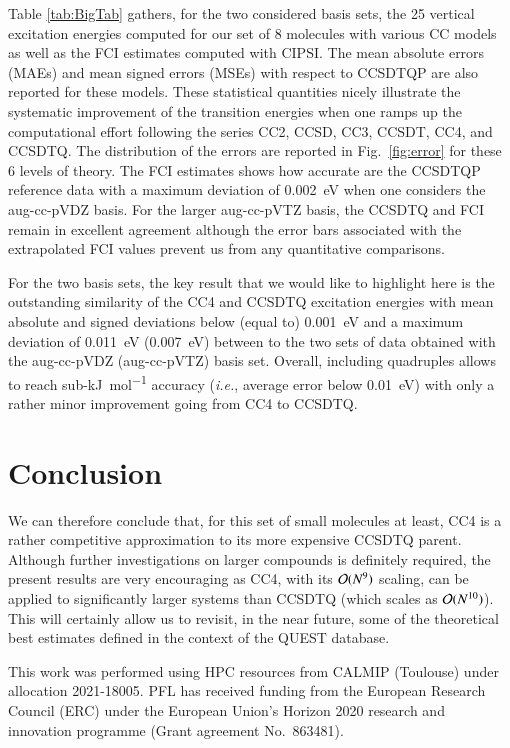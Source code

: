 \documentclass[aip,jcp,reprint,noshowkeys,superscriptaddress]{revtex4-1}
\newcommand{\ie}{\textit{i.e.}}
\begin{document}
Table \ref{tab:BigTab} gathers, for the two considered basis sets, the 25 vertical excitation energies computed for our set of 8 molecules with various CC models as well as the FCI estimates computed with CIPSI.
The mean absolute errors (MAEs) and mean signed errors (MSEs) with respect to CCSDTQP are also reported for these models.
These statistical quantities nicely illustrate the systematic improvement of the transition energies when one ramps up the computational effort following the series CC2, CCSD, CC3, CCSDT, CC4, and CCSDTQ.
The distribution of the errors are reported in Fig.~\ref{fig:error} for these 6 levels of theory.
The FCI estimates shows how accurate are the CCSDTQP reference data with a maximum deviation of \SI{0.002}{\eV} when one considers the aug-cc-pVDZ basis.
For the larger aug-cc-pVTZ basis, the CCSDTQ and FCI remain in excellent agreement although the error bars associated with the extrapolated FCI values prevent us from any quantitative comparisons.

For the two basis sets, the key result that we would like to highlight here is the outstanding similarity of the CC4 and CCSDTQ excitation energies with mean absolute and signed deviations below (equal to) \SI{0.001}{\eV} and a maximum deviation of \SI{0.011}{\eV} (\SI{0.007}{\eV}) between to the two sets of data obtained with the aug-cc-pVDZ (aug-cc-pVTZ) basis set.
Overall, including quadruples allows to reach sub-\si{\kJ\per\mol} accuracy (\ie, average error below \SI{0.01}{\eV}) with only a rather minor improvement going from CC4 to CCSDTQ.

\section{Conclusion}

We can therefore conclude that, for this set of small molecules at least, CC4 is a rather competitive approximation to its more expensive CCSDTQ parent.
Although further investigations on larger compounds is definitely required, the present results are very encouraging as CC4, with its $\order*{N^9}$ scaling, can be applied to significantly larger systems than CCSDTQ (which scales as $\order*{N^{10}}$).
This will certainly allow us to revisit, in the near future, some of the theoretical best estimates defined in the context of the QUEST database.\cite{Loos_2020a,Veril_2021}

\begin{acknowledgements}
This work was performed using HPC resources from CALMIP (Toulouse) under allocation 2021-18005.
PFL has received funding from the European Research Council (ERC) under the European Union's Horizon 2020 research and innovation programme (Grant agreement No.~863481).
\end{acknowledgements}
\end{document}
